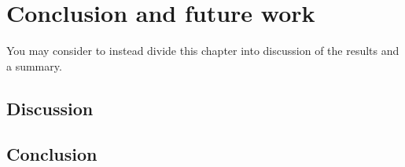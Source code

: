 \chapter{Conclusion and future work}

You may consider to instead divide this chapter into discussion of the results and a summary. 

\section{Discussion}

\section{Conclusion}
